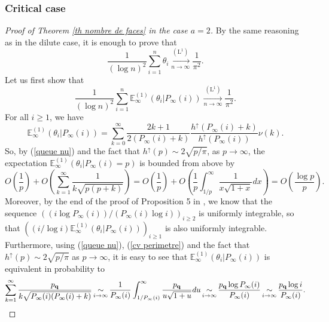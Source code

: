 \documentclass[11pt]{article}
\numberwithin{equation}{section}
\def\E{\mathbb{E}}
\begin{document}
\subsubsection{Critical case}
\begin{proof}[Proof of Theorem \ref{th nombre de faces} in the case $a=2$]
By the same reasoning as in the dilute case, it is enough to prove that
\begin{equation}\label{eq cv theta critique}
\frac{1}{(\log n)^2}\sum_{i=1}^n \theta_i
\mathop{\longrightarrow}\limits_{n\to \infty}^{(\mathrm{L}^1)}
\frac{1}{\pi^2}.
\end{equation}
Let us first show that
\begin{equation}\label{eq cv theta critique condition}
\frac{1}{(\log n)^2}\sum_{i=1}^n \E^{(1)}_\infty(\theta_i \vert P_\infty(i))
\mathop{\longrightarrow}\limits_{n\to \infty}^{(\mathrm{L}^1)}
\frac{1}{\pi^2}.
\end{equation}
For all $i \ge 1$, we have
\begin{equation}\label{eq expression theta condition}
\E^{(1)}_\infty(\theta_i \vert P_\infty(i)) = \sum_{k=0}^\infty \frac{2k+1}{2(P_\infty(i)+k)} \frac{h^\uparrow(P_\infty(i)+k)}{h^\uparrow(P_\infty(i))} \nu(k).
\end{equation}
So, by (\ref{queue nu}) and the fact that $h^\uparrow(p) \sim 2\sqrt{p/\pi}$, as $p\to \infty$, the expectation $\E^{(1)}_\infty(\theta_i \vert P_\infty(i)=p)$ is {bounded from above} by
$$
O\left(\frac{1}{p}\right)
+O\left(\sum_{k=1}^{\infty} \frac{1}{k\sqrt{p(p+k)}}\right) 
=O\left(\frac{1}{p}\right)
+O\left(\frac{1}{p}\int_{1/p}^{\infty} \frac{1}{x\sqrt{1+x}} dx\right)
=O\left(\frac{\log p}{p}\right).
$$
Moreover, by the end of the proof of Proposition 5 in \cite{BCM}, we know that the sequence $((i\log P_\infty(i))/(P_\infty(i)\log i))_{i\ge 2}$ is uniformly integrable, so that $((i/\log i)\E^{(1)}_\infty(\theta_i \vert P_\infty(i)))_{i\ge 1}$ is also uniformly integrable.
{Furthermore}, using (\ref{queue nu}), (\ref{cv perimetre}) and the fact that $h^\uparrow(p) \sim 2\sqrt{p/\pi}$ as $p \to \infty$, it is easy to see that $\E^{(1)}_\infty(\theta_i \vert P_\infty(i))$ is equivalent in probability to
$$
\sum_{k=1}^\infty \frac{p_{\bf q}}{k \sqrt{P_\infty(i) (P_\infty(i)+k)}} 
 \mathop{\sim}\limits_{i \to \infty}
\frac{1}{P_\infty(i)} \int_{1/P_\infty(i)}^\infty \frac{p_{\bf q}}{u\sqrt{1+u}} du 
 \mathop{\sim}\limits_{i \to \infty}
\frac{p_{\bf q} \log P_\infty(i)}{P_\infty(i)}
\mathop{\sim}\limits_{i \to \infty}
\frac{p_{\bf q} \log i}{P_\infty(i)}
.
$$


\end{proof}
\end{document}
